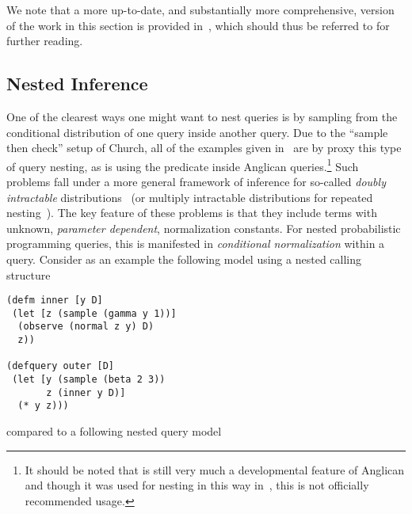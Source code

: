 We note that a more	up-to-date, and substantially more comprehensive, version of the work in this section
	is provided in~\citep{rainforth2017nestpp}, which should thus be referred to for
further reading.

\subsection{Nested Inference}
\label{sec:nest:imp:sampling}

One of the clearest ways one might want to nest queries is by sampling from the conditional
distribution of one query inside another query.  Due to the ``sample then check'' setup of
Church, all of the examples given in~\cite{stuhlmuller2014reasoning} are by proxy this
type of query nesting,
as is using the \conditional predicate inside Anglican queries.\footnote{It should be noted that  
	is still very much a developmental feature of Anglican and though it was used for nesting in this
	way in~\citep{le2016nested}, this is not officially recommended usage.}
Such problems fall under a more general framework of inference for so-called
\emph{doubly intractable} distributions~\citep{murray2006mcmc,mantadelis2011nesting} (or multiply intractable
	distributions for repeated nesting~\citep{stuhlmuller2014reasoning}).
	 The key feature of these problems is that they include
terms with unknown, \emph{parameter dependent}, normalization constants.  For nested probabilistic programming
queries, this is manifested in \emph{conditional normalization} within a query.
Consider as an example the following model using a nested calling structure
\vspace{-15pt}
\begin{lstlisting}[basicstyle=\ttfamily\footnotesize,multicols=2,frame=none]
(defm inner [y D]
 (let [z (sample (gamma y 1))]
  (observe (normal z y) D)
  z))

(defquery outer [D]
 (let [y (sample (beta 2 3))
       z (inner y D)]
  (* y z)))
\end{lstlisting}
\vspace{-25pt}
compared to a following nested query model
\vspace{-15pt}
